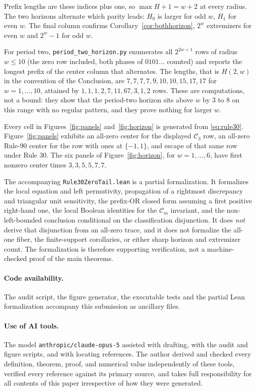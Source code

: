 \documentclass[11pt]{article}
\begin{document}
Prefix lengths are these indices plus one, so $\max H+1=w+2$ at every radius.
The two horizons alternate which parity leads: $H_0$ is larger for odd $w$,
$H_1$ for even $w$.  The final column confirms
Corollary~\ref{cor:bothhorizon}, $2^w$ extremizers for even $w$ and $2^w-1$ for
odd $w$.

For period two, \texttt{period\_two\_horizon.py} enumerates all $2^{2w+1}$ rows
of radius $w\le10$ (the zero row included, both phases of $0101\ldots$ counted)
and reports the longest prefix of the center column that alternates.  The
lengths, that is $H(2,w)$ in the convention of the Conclusion, are
$7,7,7,7,9,10,10,15,17,17$ for $w=1,\ldots,10$, attained by
$1,1,1,2,7,11,67,3,1,2$ rows.  These are computations, not a bound: they show
that the period-two horizon sits above $w$ by $3$ to $8$ on this range with no
regular pattern, and they prove nothing for larger $w$.

Every cell in Figures~\ref{fig:panels} and~\ref{fig:horizon} is generated from
\eqref{eq:rule30}.  Figure~\ref{fig:panels} exhibits an all-zero center for the
displayed $\mathcal C_3$ row, an all-zero Rule-90 center for the row with ones
at $\{-1,1\}$, and escape of that same row under Rule 30.  The six panels of
Figure~\ref{fig:horizon}, for $w=1,\ldots,6$, have first nonzero center times
$3,3,5,5,7,7$.

The accompanying \texttt{Rule30ZeroTail.lean} is a partial formalization.  It
formalizes the local equation and left permutivity, propagation of a rightmost
discrepancy and triangular unit sensitivity, the prefix-OR closed form assuming
a first positive right-hand one, the local Boolean identities for the
$\mathcal C_m$ invariant, and the non-left-bounded conclusion conditional on
the classification disjunction.  It does \emph{not} derive that disjunction from
an all-zero trace, and it does not formalize the all-one fiber, the finite-support
corollaries, or either sharp horizon and extremizer count.  The formalization is
therefore supporting verification, not a machine-checked proof of the main
theorems.

\paragraph{Code availability.}
The audit script, the figure generator, the executable tests and the partial
Lean formalization accompany this submission as ancillary files.

\paragraph{Use of AI tools.}
The model \texttt{anthropic/claude-opus-5} assisted with drafting, with the audit
and figure scripts, and with locating references.  The author derived and
checked every definition, theorem, proof, and numerical value independently of
these tools, verified every reference against its primary source, and takes full
responsibility for all contents of this paper irrespective of how they were
generated.
\end{document}

